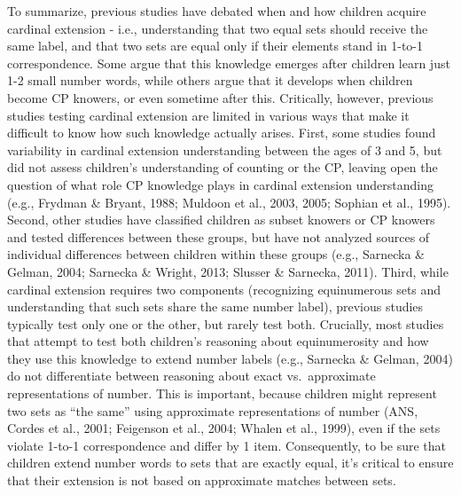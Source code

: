 \documentclass[10pt, letterpaper]{article}
\begin{document}
To summarize, previous studies have debated when and how children
acquire cardinal extension - i.e., understanding that two equal sets
should receive the same label, and that two sets are equal only if their
elements stand in 1-to-1 correspondence. Some argue that this knowledge
emerges after children learn just 1-2 small number words, while others
argue that it develops when children become CP knowers, or even sometime
after this. Critically, however, previous studies testing cardinal
extension are limited in various ways that make it difficult to know how
such knowledge actually arises. First, some studies found variability in
cardinal extension understanding between the ages of 3 and 5, but did
not assess children's understanding of counting or the CP, leaving open
the question of what role CP knowledge plays in cardinal extension
understanding (e.g., Frydman \& Bryant, 1988; Muldoon et al., 2003,
2005; Sophian et al., 1995). Second, other studies have classified
children as subset knowers or CP knowers and tested differences between
these groups, but have not analyzed sources of individual differences
between children within these groups (e.g., Sarnecka \& Gelman, 2004;
Sarnecka \& Wright, 2013; Slusser \& Sarnecka, 2011). Third, while
cardinal extension requires two components (recognizing equinumerous
sets and understanding that such sets share the same number label),
previous studies typically test only one or the other, but rarely test
both. Crucially, most studies that attempt to test both children's
reasoning about equinumerosity and how they use this knowledge to extend
number labels (e.g., Sarnecka \& Gelman, 2004) do not differentiate
between reasoning about exact vs.~approximate representations of number.
This is important, because children might represent two sets as ``the
same'' using approximate representations of number (ANS, Cordes et al.,
2001; Feigenson et al., 2004; Whalen et al., 1999), even if the sets
violate 1-to-1 correspondence and differ by 1 item. Consequently, to be
sure that children extend number words to sets that are exactly equal,
it's critical to ensure that their extension is not based on approximate
matches between sets.
\end{document}

